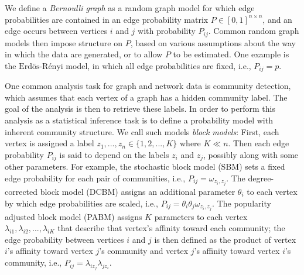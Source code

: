 \documentclass[12pt]{article}
\begin{document}
We define a \emph{Bernoulli graph} as a random graph model for which
edge probabilities are contained in an edge probability matrix
\(P \in [0, 1]^{n \times n}\), and an edge occurs between vertices \(i\)
and \(j\) with probability \(P_{ij}\). Common random graph models then
impose structure on \(P\), based on various assumptions about the way in
which the data are generated, or to allow \(P\) to be estimated. One
example is the \(\text{Erd\"{o}s-R\'{e}nyi}\) model, in which all edge
probabilities are fixed, i.e., \(P_{ij} = p\).

One common analysis task for graph and network data is community
detection, which assumes that each vertex of a graph has a hidden
community label. The goal of the analysis is then to retrieve these
labels. In order to perform this analysis as a statistical inference
task is to define a probability model with inherent community structure.
We call such models \emph{block models}: First, each vertex is assigned
a label \(z_1, ..., z_n \in \{1, 2, ..., K\}\) where \(K \ll n\). Then
each edge probability \(P_{ij}\) is said to depend on the labels \(z_i\)
and \(z_j\), possibly along with some other parameters. For example, the
stochastic block model (SBM) sets a fixed edge probability for each pair
of communities, i.e., \(P_{ij} = \omega_{z_i, z_j}\). The
degree-corrected block model (DCBM) assigns an additional parameter
\(\theta_i\) to each vertex by which edge probabilities are scaled,
i.e., \(P_{ij} = \theta_i \theta_j \omega_{z_i, z_j}\). The popularity
adjusted block model (PABM) assigns \(K\) parameters to each vertex
\(\lambda_{i1}, \lambda_{i2}, ..., \lambda_{iK}\) that describe that
vertex's affinity toward each community; the edge probability between
vertices \(i\) and \(j\) is then defined as the product of vertex
\(i\)'s affinity toward vertex \(j\)'s community and vertex \(j\)'s
affinity toward vertex \(i\)'s community, i.e.,
\(P_{ij} = \lambda_{i z_j} \lambda_{j z_i}\).
\end{document}
